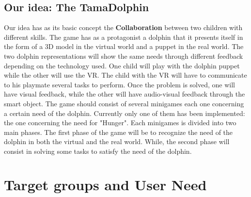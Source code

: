 \documentclass [12pt]{article}
\begin{document}
\subsection{Our idea: The TamaDolphin}
Our idea has as its basic concept the \textbf{Collaboration} between two children with different skills.
The game has as a protagonist a dolphin that it presents itself in the form of a 3D model in the virtual world and a puppet in the real world. The two dolphin representations will show the same needs through different feedback depending on the technology used.
One child will play with the dolphin puppet while the other will use the VR.
The child with the VR will have to communicate to his playmate several tasks to perform. Once the problem is solved, one will have visual feedback, while the other will have audio-visual feedback through the smart object.
The game should consist of several minigames each one concerning a certain need of the dolphin. Currently only one of them has been implemented: the one concerning the need for "Hunger". Each minigames is divided into two main phases. 
The first phase of the game will be to recognize the need of the dolphin in both the virtual and the real world. While, the second phase  will consist in solving some tasks to satisfy the need of the dolphin.




\section{Target groups and User Need}
\end{document}
